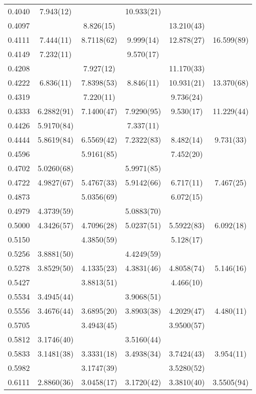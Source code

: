 \begin{longtable}{ c | c | c | c | c | c }
0.4040	&	7.943(12)	&	 	&	10.933(21)	&	 	&	 	\\
0.4097	&	 	&	8.826(15)	&	 	&	13.210(43)	&	 	\\
0.4111	&	7.444(11)	&	8.7118(62)	&	9.999(14)	&	12.878(27)	&	16.599(89)	\\
0.4149	&	7.232(11)	&	 	&	9.570(17)	&	 	&	 	\\
0.4208	&	 	&	7.927(12)	&	 	&	11.170(33)	&	 	\\
0.4222	&	6.836(11)	&	7.8398(53)	&	8.846(11)	&	10.931(21)	&	13.370(68)	\\
0.4319	&	 	&	7.220(11)	&	 	&	9.736(24)	&	 	\\
0.4333	&	6.2882(91)	&	7.1400(47)	&	7.9290(95)	&	9.530(17)	&	11.229(44)	\\
0.4426	&	5.9170(84)	&	 	&	7.337(11)	&	 	&	 	\\
0.4444	&	5.8619(84)	&	6.5569(42)	&	7.2322(83)	&	8.482(14)	&	9.731(33)	\\
0.4596	&	 	&	5.9161(85)	&	 	&	7.452(20)	&	 	\\
0.4702	&	5.0260(68)	&	 	&	5.9971(85)	&	 	&	 	\\
0.4722	&	4.9827(67)	&	5.4767(33)	&	5.9142(66)	&	6.717(11)	&	7.467(25)	\\
0.4873	&	 	&	5.0356(69)	&	 	&	6.072(15)	&	 	\\
0.4979	&	4.3739(59)	&	 	&	5.0883(70)	&	 	&	 	\\
0.5000	&	4.3426(57)	&	4.7096(28)	&	5.0237(51)	&	5.5922(83)	&	6.092(18)	\\
0.5150	&	 	&	4.3850(59)	&	 	&	5.128(17)	&	 	\\
0.5256	&	3.8881(50)	&	 	&	4.4249(59)	&	 	&	 	\\
0.5278	&	3.8529(50)	&	4.1335(23)	&	4.3831(46)	&	4.8058(74)	&	5.146(16)	\\
0.5427	&	 	&	3.8813(51)	&	 	&	4.466(10)	&	 	\\
0.5534	&	3.4945(44)	&	 	&	3.9068(51)	&	 	&	 	\\
0.5556	&	3.4676(44)	&	3.6895(20)	&	3.8903(38)	&	4.2029(47)	&	4.480(11)	\\
0.5705	&	 	&	3.4943(45)	&	 	&	3.9500(57)	&	 	\\
0.5812	&	3.1746(40)	&	 	&	3.5160(44)	&	 	&	 	\\
0.5833	&	3.1481(38)	&	3.3331(18)	&	3.4938(34)	&	3.7424(43)	&	3.954(11)	\\
0.5982	&	 	&	3.1747(39)	&	 	&	3.5280(52)	&	 	\\
0.6111	&	2.8860(36)	&	3.0458(17)	&	3.1720(42)	&	3.3810(40)	&	3.5505(94)	\\

\end{longtable}
